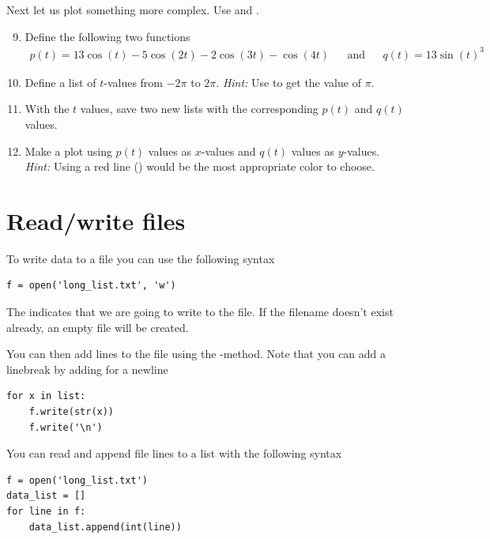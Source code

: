 \documentclass{article}
\begin{document}
Next let us plot something more complex. Use  and .

\begin{enumerate}
    \setcounter{enumi}{8}
    \item Define the following two functions
    \begin{align}
         p(t) = 13\cos(t) - 5 \cos(2t) - 2 \cos(3t) - \cos(4t) && \text{and} && q(t) = 13\sin(t)^3 
    \end{align}

    \item Define a list of $t$-values from $-2\pi$ to $2\pi$.
      {\em Hint:} Use  to get the value of $\pi$.

    \item With the $t$ values, save two new lists with the corresponding $p(t)$ and $q(t)$ values.

    \item Make a plot using $p(t)$ values as $x$-values and $q(t)$ values as $y$-values.
        {\em Hint:} Using a red line () would be the most appropriate color to choose.


\end{enumerate}


\section{Read/write files}


To write data to a file you can use the following syntax
\begin{lstlisting}
f = open('long_list.txt', 'w')
\end{lstlisting}

The  indicates that we are going to write to the file.
If the filename doesn't exist already, an empty file will be created.

You can then add lines to the file using the -method.
Note that you can add a linebreak by adding  for a newline

\begin{lstlisting}
for x in list:
    f.write(str(x))
    f.write('\n')
\end{lstlisting}

You can read and append file lines to a list with the following syntax
\begin{lstlisting}
f = open('long_list.txt')
data_list = []
for line in f:
    data_list.append(int(line))
\end{lstlisting}
\end{document}
